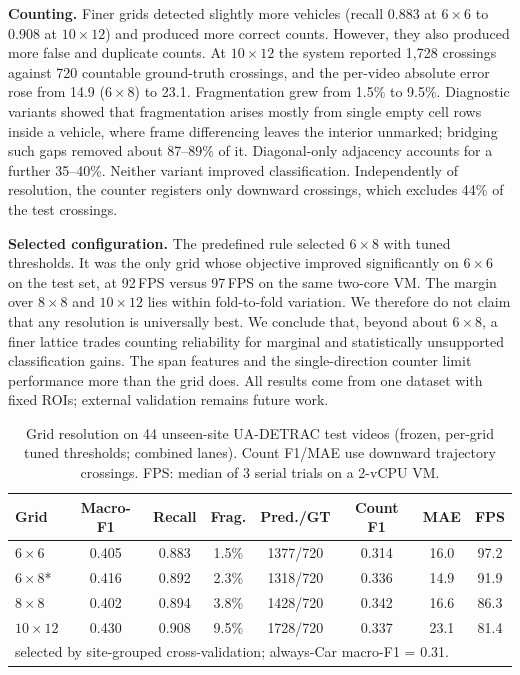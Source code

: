 \textbf{Counting.} Finer grids detected slightly more vehicles (recall 0.883 at
$6{\times}6$ to 0.908 at $10{\times}12$) and produced more correct counts.
However, they also produced more false and duplicate counts. At $10{\times}12$
the system reported 1{,}728 crossings against 720 countable ground-truth
crossings, and the per-video absolute error rose from 14.9 ($6{\times}8$) to
23.1. Fragmentation grew from 1.5\% to 9.5\%. Diagnostic variants showed that
fragmentation arises mostly from single empty cell rows inside a vehicle, where
frame differencing leaves the interior unmarked; bridging such gaps removed
about 87--89\% of it. Diagonal-only adjacency accounts for a further 35--40\%.
Neither variant improved classification. Independently of resolution, the
counter registers only downward crossings, which excludes 44\% of the test
crossings.

\textbf{Selected configuration.} The predefined rule selected $6{\times}8$ with
tuned thresholds. It was the only grid whose objective improved significantly on
$6{\times}6$ on the test set, at 92\,FPS versus 97\,FPS on the same
two-core VM. The margin over $8{\times}8$ and $10{\times}12$ lies within
fold-to-fold variation. We therefore do not claim that any resolution is
universally best. We conclude that, beyond about $6{\times}8$, a finer
lattice trades counting reliability for marginal and statistically unsupported
classification gains. The span features and the single-direction counter limit
performance more than the grid does. All results come from one dataset with fixed
ROIs; external validation remains future work.

\begin{table}[t]
\centering
\caption{Grid resolution on 44 unseen-site UA-DETRAC test videos (frozen,
per-grid tuned thresholds; combined lanes). Count F1/MAE use downward
trajectory crossings. FPS: median of 3 serial trials on a 2-vCPU VM.}
\label{tab:grid}
\setlength{\tabcolsep}{3pt}
\begin{tabular}{lccccccc}
\hline
Grid & Macro-F1 & Recall & Frag. & Pred./GT & Count F1 & MAE & FPS\\
\hline
$6{\times}6$   & 0.405 & 0.883 & 1.5\% & 1377/720 & 0.314 & 16.0 & 97.2\\
$6{\times}8$*  & 0.416 & 0.892 & 2.3\% & 1318/720 & 0.336 & 14.9 & 91.9\\
$8{\times}8$   & 0.402 & 0.894 & 3.8\% & 1428/720 & 0.342 & 16.6 & 86.3\\
$10{\times}12$ & 0.430 & 0.908 & 9.5\% & 1728/720 & 0.337 & 23.1 & 81.4\\
\hline
\multicolumn{8}{l}{\footnotesize *selected by site-grouped cross-validation; always-Car macro-F1 = 0.31.}\\
\end{tabular}
\end{table}
